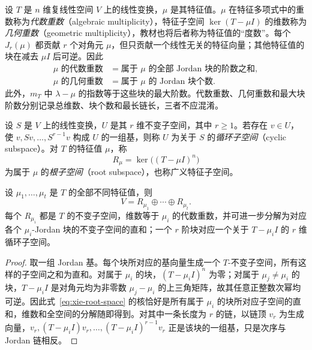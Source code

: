 设 $T$ 是 $n$ 维复线性空间 $V$ 上的线性变换，$\mu$ 是其特征值。$\mu$ 在特征多项式中的重数称为\emph{代数重数}（algebraic multiplicity），特征子空间 $\ker(T-\mu I)$ 的维数称为\emph{几何重数}（geometric multiplicity），教材也将后者称为特征值的“度数”。每个 $J_r(\mu)$ 都贡献 $r$ 个对角元 $\mu$，但只贡献一个线性无关的特征向量；其他特征值的块在减去 $\mu I$ 后可逆。因此
\begin{equation}
\label{eq:xie-jordan-multiplicities}
    \begin{aligned}
        \mu\text{ 的代数重数}&=\text{属于 }\mu\text{ 的全部 Jordan 块的阶数之和},\\
        \mu\text{ 的几何重数}&=\text{属于 }\mu\text{ 的 Jordan 块个数}.
    \end{aligned}
\end{equation}
此外，$m_T$ 中 $\lambda-\mu$ 的指数等于这些块的最大阶数。代数重数、几何重数和最大块阶数分别记录总维数、块个数和最长链长，三者不应混淆。

\begin{definition}
\label{def:xie-cyclic-root-spaces}
设 $S$ 是 $V$ 上的线性变换，$U$ 是其 $r$ 维不变子空间，其中 $r\ge1$。若存在 $v\in U$，使 $v,Sv,\ldots,S^{r-1}v$ 构成 $U$ 的一组基，则称 $U$ 为关于 $S$ 的\emph{循环子空间}（cyclic subspace）。对 $T$ 的特征值 $\mu$，称
\begin{equation}
\label{eq:xie-root-space}
    R_\mu=\ker\bigl((T-\mu I)^n\bigr)
\end{equation}
为属于 $\mu$ 的\emph{根子空间}（root subspace），也称广义特征子空间。
\end{definition}

\begin{theorem}
\label{thm:xie-root-decomposition}
设 $\mu_1,\ldots,\mu_t$ 是 $T$ 的全部不同特征值，则
\begin{equation}
\label{eq:xie-root-decomposition}
    V=R_{\mu_1}\oplus\cdots\oplus R_{\mu_t}.
\end{equation}
每个 $R_{\mu_i}$ 都是 $T$ 的不变子空间，维数等于 $\mu_i$ 的代数重数，并可进一步分解为对应各个 $\mu_i$-Jordan 块的不变子空间的直和；一个 $r$ 阶块对应一个关于 $T-\mu_iI$ 的 $r$ 维循环子空间。
\end{theorem}
\begin{proof}
取一组 Jordan 基。每个块所对应的基向量生成一个 $T$-不变子空间，所有这样的子空间之和为直和。对属于 $\mu_i$ 的块，$(T-\mu_iI)^n$ 为零；对属于 $\mu_j\ne\mu_i$ 的块，$T-\mu_iI$ 是对角元均为非零数 $\mu_j-\mu_i$ 的上三角矩阵，故其任意正整数次幂均可逆。因此式~\eqref{eq:xie-root-space} 的核恰好是所有属于 $\mu_i$ 的块所对应子空间的直和，维数和全空间的分解随即得到。对其中一条长度为 $r$ 的链，以链顶 $v_r$ 为生成向量，$v_r,(T-\mu_iI)v_r,\ldots,(T-\mu_iI)^{r-1}v_r$ 正是该块的一组基，只是次序与 Jordan 链相反。
\end{proof}

